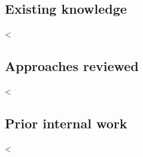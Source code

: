 \documentclass[11pt]{article}
\begin{document}
\subsection{Existing knowledge}
\begin{itemize}
<%
\end{itemize}

\subsection{Approaches reviewed}
\begin{itemize}
<%
\end{itemize}

\subsection{Prior internal work}
<%
\end{document}
